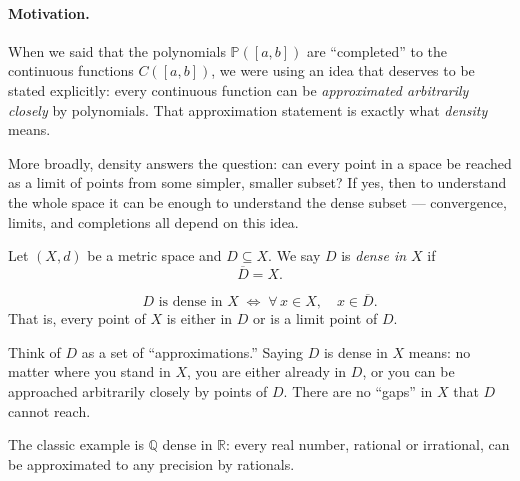\paragraph{Motivation.}
When we said that the polynomials $\mathbb{P}([a,b])$ are ``completed'' to the
continuous functions $C([a,b])$, we were using an idea that deserves to be
stated explicitly: every continuous function can be \emph{approximated
arbitrarily closely} by polynomials.
That approximation statement is exactly what \emph{density} means.

More broadly, density answers the question: can every point in a space be
reached as a limit of points from some simpler, smaller subset?
If yes, then to understand the whole space it can be enough to understand
the dense subset --- convergence, limits, and completions all depend on
this idea.

\begin{tcolorbox}[colback=propbox, colframe=propborder, arc=2pt,
  left=6pt, right=6pt, top=4pt, bottom=4pt,
  title={\small\textbf{Definition (Dense Subset)}},
  fonttitle=\small\bfseries]
\begin{definition}
\label{def:dense}
Let $(X,d)$ be a metric space and $D \subseteq X$.
We say $D$ is \emph{dense in $X$} if
\[
\overline{D} = X.
\]
\end{definition}
\end{tcolorbox}

\begin{remark*}
\[
D \text{ is dense in } X
\;\iff\;
\forall\, x \in X,\quad x \in \overline{D}.
\]
That is, every point of $X$ is either in $D$ or is a limit point of $D$.
\end{remark*}

\begin{remark*}[Intuition]
Think of $D$ as a set of ``approximations.''
Saying $D$ is dense in $X$ means: no matter where you stand in $X$,
you are either already in $D$, or you can be approached arbitrarily closely
by points of $D$.
There are no ``gaps'' in $X$ that $D$ cannot reach.

The classic example is $\mathbb{Q}$ dense in $\mathbb{R}$: every real
number, rational or irrational, can be approximated to any precision by
rationals.
\end{remark*}


